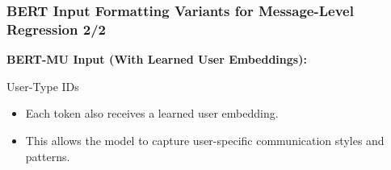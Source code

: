 \documentclass[aspectratio=169]{beamer}
\begin{document}
\begin{frame}
  \frametitle{BERT Input Formatting Variants for Message-Level Regression 2/2}

  \small
    \textbf{BERT-MU Input (With Learned User Embeddings):}
    \begin{center}
    \end{center}
    
    \vspace{0.3cm}
    \begin{block}{User-Type IDs}
      \begin{itemize}
        \item Each token also receives a learned user embedding.
        \item This allows the model to capture user-specific communication styles and patterns.
      \end{itemize}
    \end{block}
\end{frame}
\end{document}
